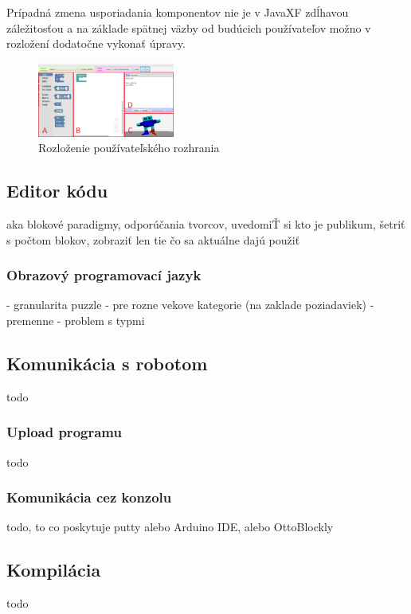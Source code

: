 Prípadná zmena usporiadania komponentov nie je v JavaXF zdĺhavou záležitosťou a na základe spätnej väzby od budúcich používateľov možno v rozložení dodatočne vykonať úpravy.

\begin{figure}
\centerline{\includegraphics[width=0.4\textwidth]{images/rozlozenie-gui}}
\caption[Rozloženie používateľského rozhrania]{Rozloženie používateľského rozhrania}
\label{obr:gui-layout}
\end{figure}


\subsection{Editor kódu}
aka blokové paradigmy, odporúčania tvorcov, uvedomiŤ si kto je publikum, šetriť s počtom blokov, zobraziť len tie čo sa aktuálne dajú použiť

\subsubsection{Obrazový programovací jazyk}
- granularita puzzle
- pre rozne vekove kategorie (na zaklade poziadaviek)
- premenne - problem s typmi

\subsection{Komunikácia s robotom}
todo

\subsubsection{Upload programu}
todo

\subsubsection{Komunikácia cez konzolu}
todo, to co poskytuje putty alebo Arduino IDE, alebo OttoBlockly

\subsection{Kompilácia}
todo

